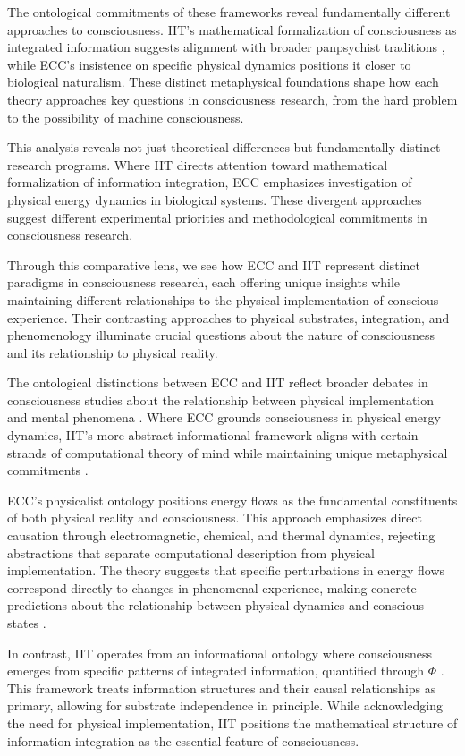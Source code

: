 The ontological commitments of these frameworks reveal fundamentally different approaches to consciousness. IIT's mathematical formalization of consciousness as integrated information suggests alignment with broader panpsychist traditions \cite{Chalmers2015}, while ECC's insistence on specific physical dynamics positions it closer to biological naturalism. These distinct metaphysical foundations shape how each theory approaches key questions in consciousness research, from the hard problem to the possibility of machine consciousness.

This analysis reveals not just theoretical differences but fundamentally distinct research programs. Where IIT directs attention toward mathematical formalization of information integration, ECC emphasizes investigation of physical energy dynamics in biological systems. These divergent approaches suggest different experimental priorities and methodological commitments in consciousness research.

Through this comparative lens, we see how ECC and IIT represent distinct paradigms in consciousness research, each offering unique insights while maintaining different relationships to the physical implementation of conscious experience. Their contrasting approaches to physical substrates, integration, and phenomenology illuminate crucial questions about the nature of consciousness and its relationship to physical reality.

The ontological distinctions between ECC and IIT reflect broader debates in consciousness studies about the relationship between physical implementation and mental phenomena \cite{Nagel1979}. Where ECC grounds consciousness in physical energy dynamics, IIT's more abstract informational framework aligns with certain strands of computational theory of mind while maintaining unique metaphysical commitments \cite{Tononi2016}.

ECC's physicalist ontology positions energy flows as the fundamental constituents of both physical reality and consciousness. This approach emphasizes direct causation through electromagnetic, chemical, and thermal dynamics, rejecting abstractions that separate computational description from physical implementation. The theory suggests that specific perturbations in energy flows correspond directly to changes in phenomenal experience, making concrete predictions about the relationship between physical dynamics and conscious states \cite{Koch2019}.

In contrast, IIT operates from an informational ontology where consciousness emerges from specific patterns of integrated information, quantified through $\Phi$ \cite{Oizumi2014}. This framework treats information structures and their causal relationships as primary, allowing for substrate independence in principle. While acknowledging the need for physical implementation, IIT positions the mathematical structure of information integration as the essential feature of consciousness.

